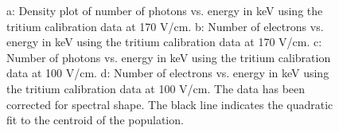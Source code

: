 \begin{figure}[h!]
\caption{a: Density plot of number of photons vs. energy in keV using the tritium calibration data at 170 V/cm. b: Number of electrons vs. energy in keV using the tritium calibration data at 170 V/cm. c: Number of photons vs. energy in keV using the tritium calibration data at 100 V/cm. d: Number of electrons vs. energy in keV using the tritium calibration data at 100 V/cm. The data has been corrected for spectral shape. The black line indicates the quadratic fit to the centroid of the population. }
\label{fig:Raw_Quanta}
\end{figure}
\renewcommand{\baselinestretch}{2}
\small\normalsize

\newpage

%
\renewcommand{\baselinestretch}{1}
\small\normalsize
\begin{figure}[h!]\centering
 
\hfill
{}

\bigskip


\end{figure}

